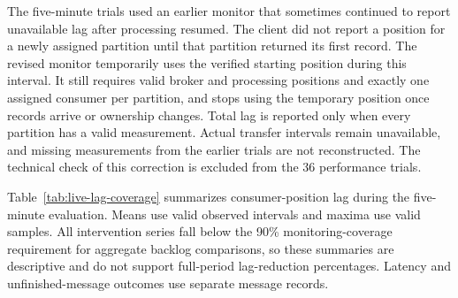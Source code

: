 \documentclass[10pt]{article}
\begin{document}
The five-minute trials used an earlier monitor that sometimes continued to report unavailable lag after processing resumed. The client did not report a position for a newly assigned partition until that partition returned its first record. The revised monitor temporarily uses the verified starting position during this interval. It still requires valid broker and processing positions and exactly one assigned consumer per partition, and stops using the temporary position once records arrive or ownership changes. Total lag is reported only when every partition has a valid measurement. Actual transfer intervals remain unavailable, and missing measurements from the earlier trials are not reconstructed. The technical check of this correction is excluded from the 36 performance trials.

Table~\ref{tab:live-lag-coverage} summarizes consumer-position lag during the five-minute evaluation. Means use valid observed intervals and maxima use valid samples. All intervention series fall below the 90\% monitoring-coverage requirement for aggregate backlog comparisons, so these summaries are descriptive and do not support full-period lag-reduction percentages. Latency and unfinished-message outcomes use separate message records.
\end{document}
